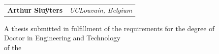 \documentclass[
  10pt, %
  english, %
  singlespacing, %
]{MastersDoctoralThesis} %
\author{Arthur \textsc{Slu\"{y}ters}} %
\begin{document}
\frontmatter %
\pagestyle{plain} %

\begin{titlepage}
  \newlength{\oldparindent}%
  \setlength{\oldparindent}{\parindent}%
  \setlength{\parindent}{0em}%
  
  \begin{center}
    \huge \bfseries \color{black} \ttitle
  \end{center}
  \vspace{-10pt}
  \begin{center}
    \Large \bfseries \color{customdarkgray} \tstitle
  \end{center}
  
  \vspace{.3cm}

  \begin{center}
    \large
    \begin{tabular}{ll}
      \textbf{Arthur Slu\"{y}ters} & \textit{UCLouvain, Belgium} \\
    \end{tabular}  
  \end{center}

  \vspace{1.4cm}
    
  \begin{center}
    \small A thesis submitted in fulfillment of the requirements for the degree of\\[0.2cm] {\large Doctor in Engineering and Technology}\\[0.2cm] of the\\[0.2cm] {\large \univname} 
  \end{center}


\end{titlepage}
\end{document}
